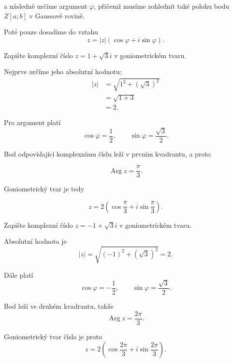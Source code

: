 \documentclass[12pt,a4paper]{article}
\begin{document}
a následně určíme argument $\varphi$, 
přičemž musíme zohlednit také polohu bodu $Z[a;b]$ v Gaussově rovině.

Poté pouze dosadíme do vztahu
\[
    z=|z|\left(\cos\varphi+i\sin\varphi\right).
\]


\begin{examplebox}
    Zapište komplexní číslo $z=1+\sqrt{3}i$ v goniometrickém tvaru.

    Nejprve určíme jeho absolutní hodnotu:
    \begin{align*}
        |z| &= \sqrt{1^2+(\sqrt{3})^2} \\
            &= \sqrt{1+3} \\
            &= 2.
    \end{align*}

    Pro argument platí
    \[
        \cos\varphi=\frac{1}{2}, \qquad \sin\varphi=\frac{\sqrt{3}}{2}.
    \]

    Bod odpovídající komplexnímu číslu leží v prvním kvadrantu, a proto

    \[
        \operatorname{Arg}z=\frac{\pi}{3}.
    \]

    Goniometrický tvar je tedy

    \[
        z= 2\left( \cos\frac{\pi}{3} + i\sin\frac{\pi}{3}\right).
    \]
\end{examplebox}

\begin{examplebox}
    Zapište komplexní číslo $z=-1+\sqrt{3}i$ v goniometrickém tvaru.

    Absolutní hodnota je
    \[
        |z| = \sqrt{(-1)^2+(\sqrt{3})^2} = 2.
    \]

    Dále platí
    \[
        \cos\varphi=-\frac{1}{2}, \qquad \sin\varphi=\frac{\sqrt{3}}{2}.
    \]

    Bod leží ve druhém kvadrantu, takže
    \[
        \operatorname{Arg}z=\frac{2\pi}{3}.
    \]

    Goniometrický tvar čísla je proto
    \[
        z= 2\left(\cos\frac{2\pi}{3} + i\sin\frac{2\pi}{3}\right).
    \]
\end{examplebox}
\end{document}
